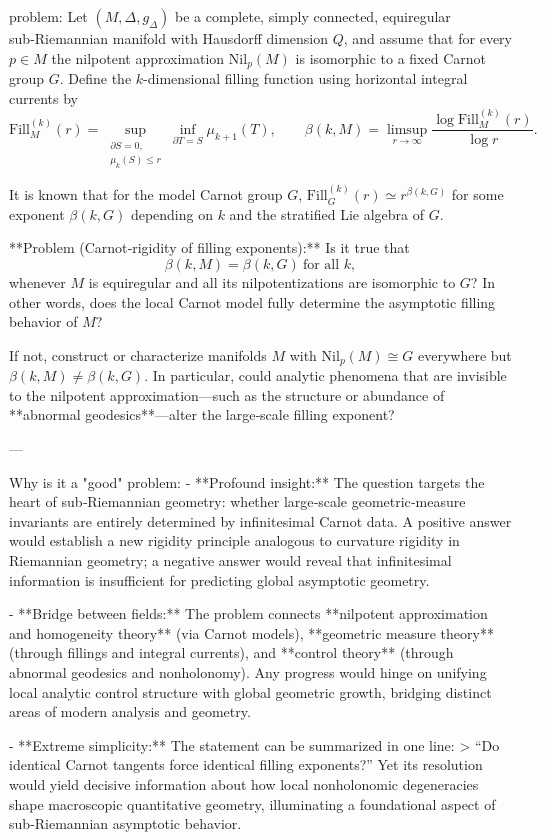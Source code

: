 problem:  
Let \((M,\Delta,g_\Delta)\) be a complete, simply connected, equiregular sub‑Riemannian manifold with Hausdorff dimension \(Q\), and assume that for every \(p\in M\) the nilpotent approximation \(\mathrm{Nil}_p(M)\) is isomorphic to a fixed Carnot group \(G\).  
Define the \(k\)-dimensional filling function using horizontal integral currents by  
\[
\mathrm{Fill}_M^{(k)}(r)=
\sup_{\substack{\partial S=0,\\\mu_k(S)\le r}}
\inf_{\partial T=S}\mu_{k+1}(T),\qquad
\beta(k,M)=\limsup_{r\to\infty}\frac{\log\mathrm{Fill}_M^{(k)}(r)}{\log r}.
\]

It is known that for the model Carnot group \(G\), \(\mathrm{Fill}_G^{(k)}(r)\simeq r^{\beta(k,G)}\) for some exponent \(\beta(k,G)\) depending on \(k\) and the stratified Lie algebra of \(G\).

**Problem (Carnot‑rigidity of filling exponents):**  
Is it true that
\[
\beta(k,M)=\beta(k,G)\ \text{for all } k,
\]
whenever \(M\) is equiregular and all its nilpotentizations are isomorphic to \(G\)?  
In other words, does the local Carnot model fully determine the asymptotic filling behavior of \(M\)?  

If not, construct or characterize manifolds \(M\) with \(\mathrm{Nil}_p(M)\cong G\) everywhere but \(\beta(k,M)\neq\beta(k,G)\).  In particular, could analytic phenomena that are invisible to the nilpotent approximation—such as the structure or abundance of **abnormal geodesics**—alter the large‑scale filling exponent?

---

Why is it a "good" problem:  
- **Profound insight:**  
  The question targets the heart of sub‑Riemannian geometry: whether large‑scale geometric‐measure invariants are entirely determined by infinitesimal Carnot data.  A positive answer would establish a new rigidity principle analogous to curvature rigidity in Riemannian geometry; a negative answer would reveal that infinitesimal information is insufficient for predicting global asymptotic geometry.  

- **Bridge between fields:**  
  The problem connects **nilpotent approximation and homogeneity theory** (via Carnot models), **geometric measure theory** (through fillings and integral currents), and **control theory** (through abnormal geodesics and nonholonomy).  Any progress would hinge on unifying local analytic control structure with global geometric growth, bridging distinct areas of modern analysis and geometry.  

- **Extreme simplicity:**  
  The statement can be summarized in one line:  
  > “Do identical Carnot tangents force identical filling exponents?”  
  Yet its resolution would yield decisive information about how local nonholonomic degeneracies shape macroscopic quantitative geometry, illuminating a foundational aspect of sub‑Riemannian asymptotic behavior.